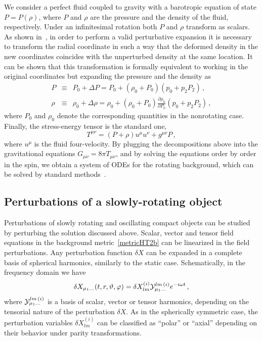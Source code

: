 \documentclass[11pt]{article}
\newcommand{\pa}{\partial}
\numberwithin{equation}{section} %
\begin{document}
We consider a perfect fluid coupled to gravity with a barotropic equation of state $P=P(\rho)$, where $P$ and $\rho$ are the pressure and the density of the fluid, respectively. Under an infinitesimal rotation both $P$ and $\rho$ transform as scalars. As shown in~\cite{Hartle:1967he,Hartle:1968si}, in order to perform a valid perturbative expansion it is necessary to transform the radial coordinate in such a way that the deformed density in the new coordinates coincides with the unperturbed density at the same location. It can be shown that this transformation is formally equivalent to working in the original coordinates but expanding the pressure and the density as
%
\begin{eqnarray}
 P&\equiv&P_0+\Delta P=P_0+(\rho_0+P_0)(p_0+p_2 P_2)\,, \label{P}\\
 \rho&\equiv&\rho_0+\Delta\rho=\rho_0+(\rho_0+P_0)\frac{\pa\rho_0}{\pa P_0}(p_0+p_2 P_2)\,,\label{rho}
\end{eqnarray}
%
where $P_0$ and $\rho_0$ denote the corresponding quantities in the nonrotating case. Finally, the stress-energy tensor is the standard one, 
\begin{equation}
 T^{\mu\nu}=(P+\rho)u^\mu u^\nu+g^{\mu\nu}P\,,
\end{equation}
where $u^\mu$ is the fluid four-velocity. By plugging the decompositions above into the
gravitational equations $G_{\mu\nu}=8\pi T_{\mu\nu}$, and by solving the
equations order by order in the spin, we obtain a system of ODEs for the rotating background, which can be solved by standard methods~\cite{Hartle:1967he,Hartle:1968si,Pani:2014jra}.

\subsection{Perturbations of a slowly-rotating object}
Perturbations of slowly rotating and oscillating compact objects can be studied by perturbing the solution discussed above.
Scalar, vector and tensor field equations in the background
metric~\eqref{metricHT2b} can be linearized in the field perturbations.
Any perturbation function $\delta X$ can be expanded in a complete basis of spherical harmonics, similarly to the static case. Schematically, in the frequency domain we have
\begin{equation}
\delta X_{\mu_1\dots}(t,r,\vartheta,\varphi)=
\delta X^{(i)}_{l m}{\cal Y}_{\mu_1\dots}^{l m\,(i)}e^{-i\omega t}\,,
\label{expa}
\end{equation}
where ${\cal Y}_{\mu_1\dots}^{l m\,(i)}$ is a basis of scalar,
vector or tensor harmonics, depending on the tensorial nature of the
perturbation $\delta X$. As in the spherically symmetric case, the perturbation variables $\delta X^{(i)}_{l m}$ can
be classified as ``polar'' or ``axial'' depending on their behavior
under parity transformations.
\end{document}
